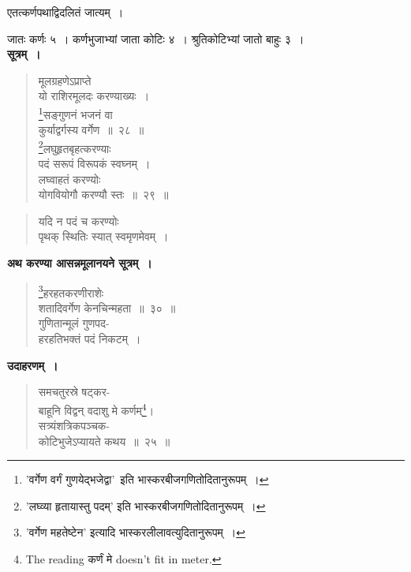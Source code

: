 \documentclass[11pt, openany]{book}
\begin{document}
 एतत्कर्णपथाद्विदलितं जात्यम्~। 
\vspace{2mm}

 जातः कर्णः ५~। कर्णभुजाभ्यां जाता कोटिः ४~। श्रुतिकोटिभ्यां जातो बाहुः ३~। \\

 \textbf{सूत्रम्~।} 
\begin{quote}
    \bs
मूलग्रहणेऽप्राप्ते \\
यो राशिरमूलदः करण्याख्यः~।\\
\footnote{'{\color{violet}वर्गेण वर्गं गुणयेद्भजेद्वा}'\textendash\ इति {\color{violet}भास्करबीजगणितो}दितानुरूपम्~। }सङ्गुणनं भजनं वा \\
कुर्याद्वर्गस्य वर्गेण~॥~२८~॥\\
 \footnote{'{\color{violet}लघ्व्या हृतायास्तु पदम्}' इति {\color{violet}भास्करबीजगणितो}दितानुरूपम्~। }लघुहृतबृहत्करण्याः \\
पदं सरूपं विरूपकं स्वघ्नम्~।\\
लघ्वाहतं करण्योः \\
योगवियोगौ करण्यौ स्तः~॥~२९~॥
\end{quote}

\newpage%

\begin{quote}
    \bs
यदि न पदं च करण्योः \\
पृथक् स्थितिः स्यात् स्वमृणमेवम्~।
\end{quote}

\setcounter{footnote}{0}
\textbf{ अथ करण्या आसन्नमूलानयने सूत्रम्~। }

 \label{4.31}
\begin{quote}
    \bs 
     \footnote{'{\color{violet}वर्गेण महतेष्टेन}' इत्यादि {\color{violet}भास्करलीलावत्यु}दितानुरूपम्~। }हरहतकरणीराशेः \\
     शतादिवर्गेण केनचिन्महता~॥~३०~॥\\
गुणितान्मूलं गुणपद-\\
हरहतिभक्तं पदं निकटम्~। 
\end{quote}

 \textbf{उदाहरणम्~।} 
\begin{quote}
    \bqt 
     समचतुरस्रे षट्कर-\\
     बाहूनि विद्वन् वदाशु मे कर्णम्\footnote{The reading कर्णं मे doesn't fit in meter.}।\\
सत्र्यंशत्रिकपञ्चक-\\
कोटिभुजेऽप्यायते कथय~॥~२५~॥
\end{quote}
\end{document}
